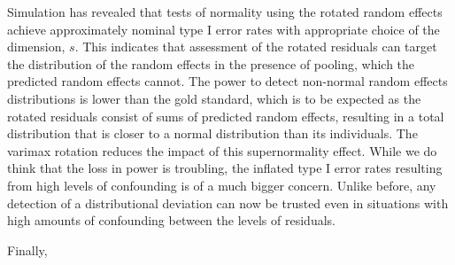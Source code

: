 \documentclass[12pt]{article} %
\begin{document}

Simulation has revealed that tests of normality using the rotated random effects achieve approximately nominal type I error rates with appropriate choice of the dimension, $s$. This indicates that assessment of the rotated residuals can target the distribution of the random effects in the presence of pooling, which the predicted random effects cannot. The power to detect non-normal random effects distributions is lower than the gold standard, which is to be expected as the rotated residuals consist of sums of predicted random effects, resulting in a total distribution that is closer to a normal distribution than its individuals.  %
The varimax rotation reduces the impact of this supernormality effect. %
While we do think that the loss in power is troubling,
 the inflated type I error rates resulting from high levels of confounding is of a much bigger concern. Unlike before,  any detection of a distributional deviation can now be trusted even in situations with high amounts of  confounding between the levels of residuals.
 
 Finally,
  
 

\end{document}
